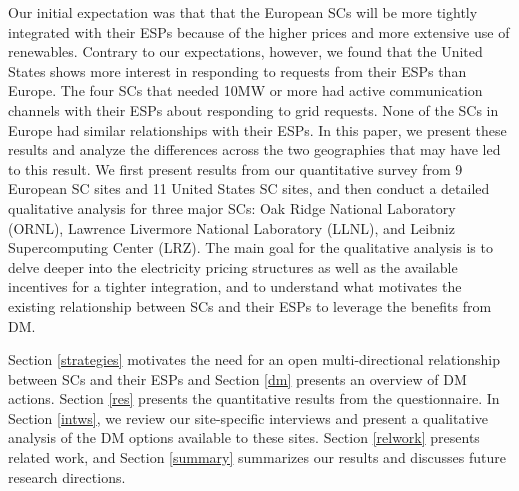 Our initial expectation was that that the European SCs will be more tightly integrated with their ESPs because of the higher prices and more extensive use of renewables.  Contrary to our expectations, however, we found that the United States shows more interest in responding to requests from their ESPs than Europe. The four SCs that needed 10MW or more had active communication channels with their ESPs about responding to grid requests.  None of the SCs in Europe had similar relationships with their ESPs. In this paper, we present these results and analyze the differences across the two geographies that may have led to this result. We first present results from our quantitative survey from 9 European SC sites and 11 United States SC sites, and then conduct a detailed qualitative analysis for three major SCs: Oak Ridge National Laboratory (ORNL), Lawrence Livermore National Laboratory (LLNL), and Leibniz Supercomputing Center (LRZ). The main goal for the qualitative analysis is to delve deeper into the electricity pricing structures as well as the available incentives for a tighter integration, and to understand what motivates the existing relationship between SCs and their ESPs to leverage the benefits from DM. 

Section \ref{strategies} motivates the need for an open multi-directional relationship between SCs and their ESPs and Section \ref{dm} presents an overview of DM actions. Section \ref{res} presents the quantitative results from the questionnaire. In Section \ref{intws}, we review our site-specific interviews and present a qualitative analysis of the DM options available to these sites. Section \ref{relwork} presents related work, and Section \ref{summary} summarizes our results and discusses future research directions.